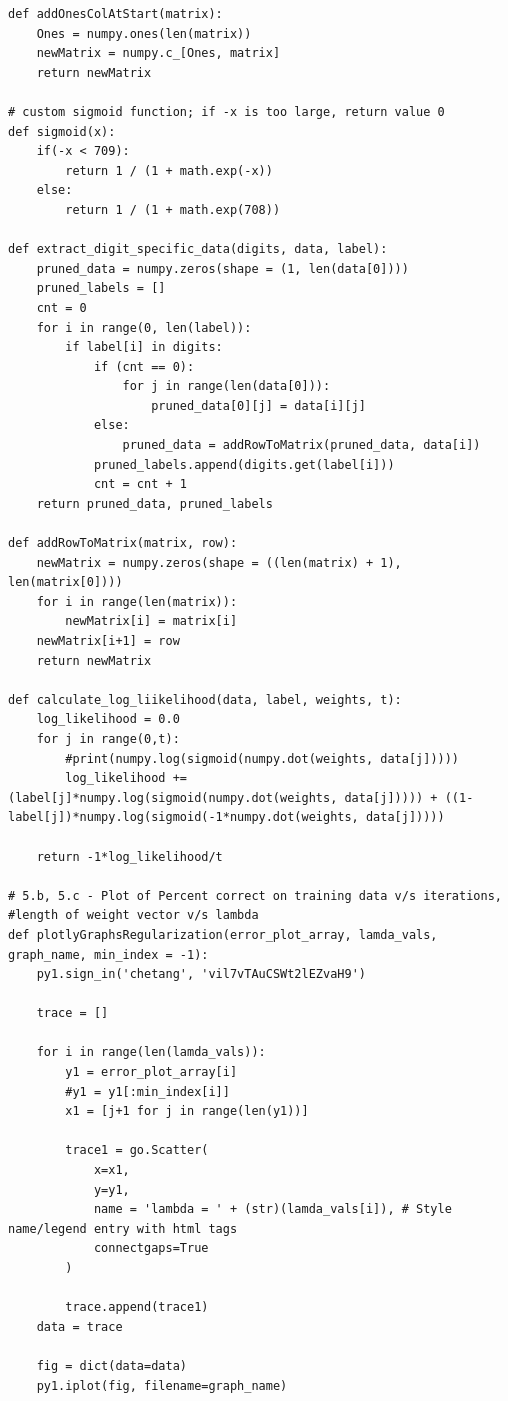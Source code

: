 \documentclass{article}
\begin{document}
\begin{lstlisting}
def addOnesColAtStart(matrix):
    Ones = numpy.ones(len(matrix))
    newMatrix = numpy.c_[Ones, matrix]
    return newMatrix
    
# custom sigmoid function; if -x is too large, return value 0
def sigmoid(x):
    if(-x < 709):
        return 1 / (1 + math.exp(-x))
    else:
        return 1 / (1 + math.exp(708))

def extract_digit_specific_data(digits, data, label):
    pruned_data = numpy.zeros(shape = (1, len(data[0])))
    pruned_labels = []
    cnt = 0
    for i in range(0, len(label)):
        if label[i] in digits:
            if (cnt == 0):
                for j in range(len(data[0])):
                    pruned_data[0][j] = data[i][j]
            else:
                pruned_data = addRowToMatrix(pruned_data, data[i])
            pruned_labels.append(digits.get(label[i]))
            cnt = cnt + 1
    return pruned_data, pruned_labels
        
def addRowToMatrix(matrix, row):
    newMatrix = numpy.zeros(shape = ((len(matrix) + 1), len(matrix[0])))
    for i in range(len(matrix)):
        newMatrix[i] = matrix[i]
    newMatrix[i+1] = row
    return newMatrix
    
def calculate_log_liikelihood(data, label, weights, t):
    log_likelihood = 0.0
    for j in range(0,t):
        #print(numpy.log(sigmoid(numpy.dot(weights, data[j]))))
        log_likelihood += (label[j]*numpy.log(sigmoid(numpy.dot(weights, data[j])))) + ((1-label[j])*numpy.log(sigmoid(-1*numpy.dot(weights, data[j]))))
        
    return -1*log_likelihood/t

# 5.b, 5.c - Plot of Percent correct on training data v/s iterations, 
#length of weight vector v/s lambda
def plotlyGraphsRegularization(error_plot_array, lamda_vals, graph_name, min_index = -1):
    py1.sign_in('chetang', 'vil7vTAuCSWt2lEZvaH9')

    trace = []
    
    for i in range(len(lamda_vals)):
        y1 = error_plot_array[i]
        #y1 = y1[:min_index[i]]
        x1 = [j+1 for j in range(len(y1))]
        
        trace1 = go.Scatter(
            x=x1,
            y=y1,
            name = 'lambda = ' + (str)(lamda_vals[i]), # Style name/legend entry with html tags
            connectgaps=True
        )

        trace.append(trace1)
    data = trace

    fig = dict(data=data)
    py1.iplot(fig, filename=graph_name)
    

\end{lstlisting}
\end{document}
